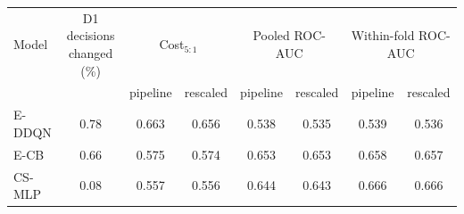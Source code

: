 \begin{tabular}{lccccccc}
\toprule
Model & D1 decisions changed (\%) & \multicolumn{2}{c}{Cost$_{5:1}$} & \multicolumn{2}{c}{Pooled ROC-AUC} & \multicolumn{2}{c}{Within-fold ROC-AUC} \\
 & & pipeline & rescaled & pipeline & rescaled & pipeline & rescaled \\
\midrule
E-DDQN & 0.78 & 0.663 & 0.656 & 0.538 & 0.535 & 0.539 & 0.536 \\
E-CB & 0.66 & 0.575 & 0.574 & 0.653 & 0.653 & 0.658 & 0.657 \\
CS-MLP & 0.08 & 0.557 & 0.556 & 0.644 & 0.643 & 0.666 & 0.666 \\
\bottomrule
\end{tabular}
